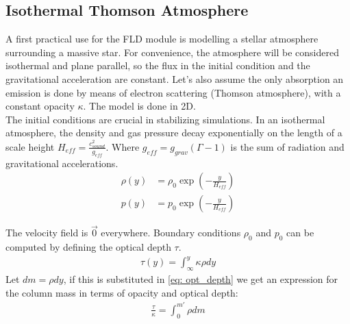 \subsection{Isothermal Thomson Atmosphere} \label{section: IsoAtm}
A first practical use for the FLD module is modelling a stellar atmosphere surrounding a massive star. For convenience, the atmosphere will be considered isothermal and plane parallel, so the flux in the initial condition and the gravitational acceleration are constant. Let's also assume the only absorption an emission is done by means of electron scattering (Thomson atmosphere), with a constant opacity $\kappa$. The model is done in 2D.\\

The initial conditions are crucial in stabilizing simulations. In an isothermal atmosphere, the density and gas pressure decay exponentially on the length of a scale height $H_{eff} = \frac{c_{sound}^2}{g_{eff}}$. Where $g_{eff} = g_{grav}(\Gamma - 1)$ is the sum of radiation and gravitational accelerations. 
\begin{align}
\rho(y) &= \rho_0 \exp \left( -\frac{y}{H_{eff}} \right) \\
 p(y)   &= p_0    \exp \left( -\frac{y}{H_{eff}} \right)
\end{align}

The velocity field is $\vec{0}$ everywhere. Boundary conditions $\rho_0$ and $p_0$ can be computed by defining the optical depth $\tau$. 
\begin{align}
\tau(y) = \int_\infty^{y} \kappa \rho dy  \label{eq: opt_depth}
\end{align}
Let $dm = \rho dy$, if this is substituted in \eqref{eq: opt_depth} we get an expression for the column mass in terms of opacity and optical depth:
\begin{align}
\frac{\tau}{\kappa} = \int_0^{m'} \rho dm
\end{align}


